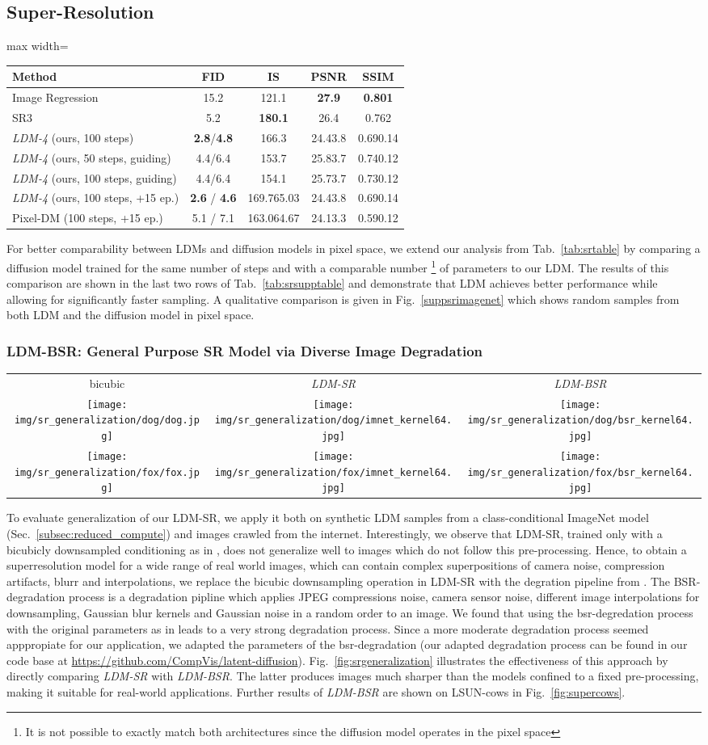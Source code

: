 \documentclass[10pt,twocolumn,letterpaper]{article}
\newcommand{\srgeneralization}{
\begin{figure*}[htbp]
\addtolength{\tabcolsep}{-4.4pt}    
\begin{tabular}{ccc}
bicubic & \emph{LDM-SR} & \emph{LDM-BSR} \\
\texttt{[image: img/sr\_generalization/dog/dog.jpg]}&
\texttt{[image: img/sr\_generalization/dog/imnet\_kernel64.jpg]}&
\texttt{[image: img/sr\_generalization/dog/bsr\_kernel64.jpg]}\\
\texttt{[image: img/sr\_generalization/fox/fox.jpg]}&
\texttt{[image: img/sr\_generalization/fox/imnet\_kernel64.jpg]}&
\texttt{[image: img/sr\_generalization/fox/bsr\_kernel64.jpg]}\\
\end{tabular}
\addtolength{\tabcolsep}{4.4pt}
\vspace*{-1em}
\caption{\label{fig:srgeneralization} 
\emph{LDM-BSR} generalizes to arbitrary inputs and can be used as a general-purpose upsampler,
upscaling samples from a class-conditional \emph{LDM} (image \cf Fig.~\ref{fig:samples_mix}) to  resolution. In contrast, 
using a fixed degradation process (see Sec.~\ref{subsec:superres}) hinders generalization.\vspace{-1em}}
\end{figure*}
}
\newcommand{\projectpath}{https://github.com/CompVis/latent-diffusion}
\newcommand{\srsuppptable}{
  \begin{table*}[pbth]
  \centering
\begin{footnotesize}
  \begin{adjustbox}{max width=\linewidth}
  \begin{tabular}{l c c c c}
  	\toprule
  	\textbf{Method} & FID  & IS  & PSNR    & SSIM    \\
  	\midrule
  	Image Regression \cite{DBLP:journals/corr/abs-2104-07636} & 15.2 & 121.1 & \textbf{27.9} & \textbf{0.801} \\
  	SR3 \cite{DBLP:journals/corr/abs-2104-07636} & 5.2 & \textbf{180.1} & 26.4 & 0.762 \\
  	\midrule
\emph{LDM-4} (ours, 100 steps) & \textbf{2.8}/\textbf{4.8} & 166.3 & 24.4\tiny{3.8} & 0.69\tiny{0.14} \\
  	\emph{LDM-4} (ours, 50 steps, guiding) & 4.4/6.4 & 153.7 & 25.8\tiny{3.7} & 0.74\tiny{0.12} \\
\emph{LDM-4} (ours, 100 steps, guiding) & 4.4/6.4 & 154.1 & 25.7\tiny{3.7} & 0.73\tiny{0.12} \\
  	\midrule
\emph{LDM-4} (ours, 100 steps, +15 ep.) & \textbf{2.6} / \textbf{4.6} & 169.76\tiny{5.03} & 24.4\tiny{3.8} & 0.69\tiny{0.14} \\
  	Pixel-DM (100 steps, +15 ep.) & 5.1 / 7.1 & 163.06\tiny{4.67} & 24.1\tiny{3.3} & 0.59\tiny{0.12}  \\
  	\bottomrule

  \end{tabular}
  \end{adjustbox}
\end{footnotesize}\vspace{-0.85em}
  \caption{\label{tab:srsupptable}   upscaling results on ImageNet-Val. (); : FID features computed on validation split, : FID features computed on train split. We also include a pixel-space baseline that receives the same amount of compute as \emph{LDM-4}. The last two rows received 15 epochs of additional training compared to the former results. }
\end{table*}
}
\begin{document}
\subsection{Super-Resolution}
\label{suppsec:superres}
\srsuppptable
For better comparability between LDMs and diffusion models in pixel space, we extend our analysis from Tab.~\ref{tab:srtable} by comparing a diffusion model trained for the same number of steps and with a comparable number \footnote{It is not possible to exactly match both architectures since the diffusion model operates in the pixel space} of parameters to our LDM. The results of this comparison are shown in the last two rows of Tab.~\ref{tab:srsupptable} and demonstrate that LDM achieves better performance while allowing for significantly faster sampling. 
A qualitative comparison is given in Fig.~\ref{suppsrimagenet} which shows random samples from both LDM and the diffusion model in pixel space.

\subsubsection{LDM-BSR: General Purpose SR Model via Diverse Image Degradation}
\label{suppsubsubsec:bsr}
\srgeneralization
To evaluate generalization of our LDM-SR, we apply it both on synthetic LDM samples from a class-conditional ImageNet model (Sec.~\ref{subsec:reduced_compute}) and images crawled from the internet.
Interestingly, we observe that LDM-SR, trained only with a bicubicly
downsampled conditioning as in \cite{DBLP:journals/corr/abs-2104-07636}, does
not generalize well to images which do not follow this pre-processing.
Hence, to obtain a superresolution model for a wide range of real world images, which can contain complex superpositions of camera noise, compression artifacts, blurr and interpolations, we replace the bicubic downsampling operation in LDM-SR with the degration pipeline from \cite{bsrgan}. The BSR-degradation process is a degradation pipline which applies JPEG compressions noise, camera sensor noise, different image interpolations for downsampling, Gaussian blur kernels and Gaussian noise in a random order to an image. We found that using the bsr-degredation process with the original parameters as in \cite{bsrgan} leads to a very strong degradation process. Since a more moderate degradation process seemed apppropiate for our application, we adapted the parameters of the bsr-degradation (our adapted degradation process can be found in our code base at \url{\projectpath}).
Fig.~\ref{fig:srgeneralization} illustrates the effectiveness of this approach by directly comparing \emph{LDM-SR} with \emph{LDM-BSR}. The latter produces images much sharper than the models confined to a
fixed pre-processing, making it suitable for real-world applications.
Further results of \emph{LDM-BSR} are shown on LSUN-cows in Fig.~\ref{fig:supercows}.
\end{document}
